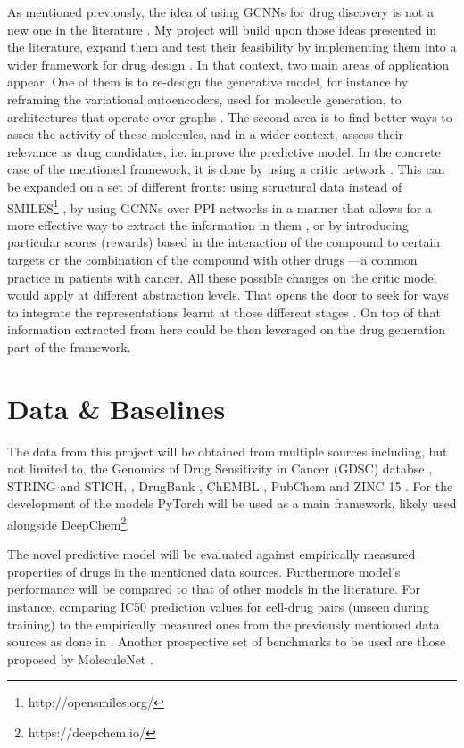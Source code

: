 \documentclass{article}
\begin{document}
As mentioned previously, the idea of using GCNNs for drug discovery is not a new one in
the literature \cite{Sun2019}. My project will build upon those ideas presented in the
literature, expand them and test their feasibility by implementing them into a wider
framework for drug design \cite{Born2019}. In that context, two main areas of
application appear. One of them is to re-design the generative model, for instance by
reframing the variational autoencoders, used for molecule generation, to architectures
that operate over graphs \cite{Simonovsky2018,Li2018, Li2018a}. The second area is to
find better ways to asses the activity of these molecules, and in a wider context,
assess their relevance as drug candidates, i.e. improve the predictive model. In the
concrete case of the mentioned framework, it is done by using a critic network
\cite{Manica2019}. This can be expanded on a set of different fronts: using structural
data instead of SMILES\footnote{http://opensmiles.org/} \cite{Li, Do2019}, {\color{red}
by using GCNNs over PPI networks in a manner that allows for a more effective way to
extract the information in them} \cite{Oskooei2019, Wang2019}, or by introducing
particular scores (rewards) based in the interaction of the compound to certain targets
\cite{YingkaiGao2018, Zhavoronkov2019} or the combination of the compound with other
drugs \cite{Zitnik2018}---a common practice in patients with cancer. All these possible
changes on the critic model would apply at different abstraction levels. That opens the
door to seek for ways to integrate the representations learnt at those different stages
\cite{Ying2018, Ma2019, Huang2019}. On top of that information extracted from here could
be then leveraged on the drug generation part of the framework.


    \section*{Data \& Baselines}

The data from this project will be obtained from multiple sources including, but not
limited to, the Genomics of Drug Sensitivity in Cancer (GDSC) databse \cite{Yang2013},
STRING and STICH, \cite{Szklarczyk2019,Szklarczyk2016}, DrugBank \cite{Wishart2006},
ChEMBL \cite{Gaulton2017}, PubChem \cite{Kim2019} and ZINC 15 \cite{Sterling2015}. For
the development of the models PyTorch \cite{Paszke2019} will be used as a main
framework, likely used alongside DeepChem\footnote{https://deepchem.io/}.

The novel predictive model will be evaluated against empirically measured properties of
drugs in the mentioned data sources. Furthermore model's performance will be compared to
that of other models in the literature. For instance, comparing IC50 prediction values
for cell-drug pairs (unseen during training) to the empirically measured ones from
the previously mentioned data sources as done in \cite{Oskooei2019, Joo2019,
Oskooei2018}. Another prospective set of benchmarks to be used are those proposed by
MoleculeNet \cite{Wu2018}.
\end{document}
